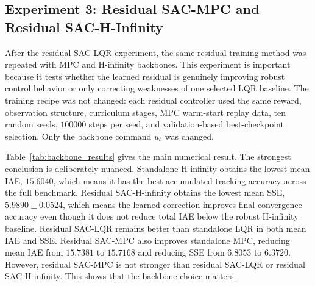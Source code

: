 \documentclass[conference]{IEEEtran}
\begin{document}
\subsection{Experiment 3: Residual SAC-MPC and Residual SAC-H-Infinity}
After the residual SAC-LQR experiment, the same residual training method was repeated with MPC and H-infinity backbones. This experiment is important because it tests whether the learned residual is genuinely improving robust control behavior or only correcting weaknesses of one selected LQR baseline. The training recipe was not changed: each residual controller used the same reward, observation structure, curriculum stages, MPC warm-start replay data, ten random seeds, $100000$ steps per seed, and validation-based best-checkpoint selection. Only the backbone command $u_b$ was changed.

Table~\ref{tab:backbone_results} gives the main numerical result. The strongest conclusion is deliberately nuanced. Standalone H-infinity obtains the lowest mean IAE, $15.6040$, which means it has the best accumulated tracking accuracy across the full benchmark. Residual SAC-H-infinity obtains the lowest mean SSE, $5.9890 \pm 0.0524$, which means the learned correction improves final convergence accuracy even though it does not reduce total IAE below the robust H-infinity baseline. Residual SAC-LQR remains better than standalone LQR in both mean IAE and SSE. Residual SAC-MPC also improves standalone MPC, reducing mean IAE from $15.7381$ to $15.7168$ and reducing SSE from $6.8053$ to $6.3720$. However, residual SAC-MPC is not stronger than residual SAC-LQR or residual SAC-H-infinity. This shows that the backbone choice matters.
\end{document}
